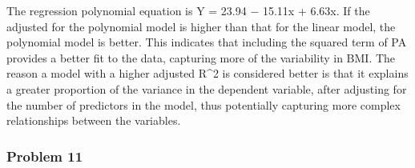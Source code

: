 \documentclass[
]{article}
\newenvironment{Shaded}{\begin{snugshade}}{\end{snugshade}}
\newcommand{\AttributeTok}[1]{\textcolor[rgb]{0.13,0.29,0.53}{#1}}
\newcommand{\DecValTok}[1]{\textcolor[rgb]{0.00,0.00,0.81}{#1}}
\newcommand{\FunctionTok}[1]{\textcolor[rgb]{0.13,0.29,0.53}{\textbf{#1}}}
\newcommand{\NormalTok}[1]{#1}
\newcommand{\OtherTok}[1]{\textcolor[rgb]{0.56,0.35,0.01}{#1}}
\newcommand{\SpecialCharTok}[1]{\textcolor[rgb]{0.81,0.36,0.00}{\textbf{#1}}}
\newcommand{\StringTok}[1]{\textcolor[rgb]{0.31,0.60,0.02}{#1}}
\begin{document}
The regression polynomial equation is Y = 23.94 − 15.11x + 6.63x. If the
adjusted for the polynomial model is higher than that for the linear
model, the polynomial model is better. This indicates that including the
squared term of PA provides a better fit to the data, capturing more of
the variability in BMI. The reason a model with a higher adjusted R\^{}2
is considered better is that it explains a greater proportion of the
variance in the dependent variable, after adjusting for the number of
predictors in the model, thus potentially capturing more complex
relationships between the variables.

\hypertarget{problem-11}{%
\subsubsection{Problem 11}\label{problem-11}}

\begin{Shaded}
\end{Shaded}
\end{document}
